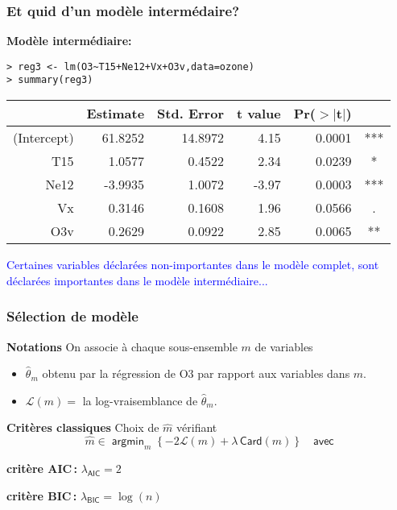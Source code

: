 \documentclass{beamer}
\newcommand{\ac}[1]{\left\{#1\right\}}
\begin{document}


\begin{frame}[fragile]
\frametitle{\bf  Et quid d'un mod\`ele interm\'edaire?}
{\bf Mod\`ele interm\'ediaire:}
\begin{small}
\begin{verbatim}
> reg3 <- lm(O3~T15+Ne12+Vx+O3v,data=ozone)
> summary(reg3)
\end{verbatim}
\begin{tabular}{r|rrrrc}
 & Estimate & Std. Error & t value & Pr($>$$|$t$|$)& \\ 
  \hline
(Intercept) & 61.8252 & 14.8972 & 4.15 & 0.0001& ***\\ 
  T15 & 1.0577 & 0.4522 & 2.34 & 0.0239& *\\ 
  Ne12 & -3.9935 & 1.0072 & -3.97 & 0.0003& ***\\ 
  Vx & 0.3146 & 0.1608 & 1.96 & 0.0566& .\\ 
  O3v & 0.2629 & 0.0922 & 2.85 & 0.0065& **
\end{tabular}
\end{small}
\vfill

\textcolor{blue}{Certaines variables d\'eclar\'ees non-importantes dans le mod\`ele complet, sont d\'eclar\'ees importantes dans le mod\`ele interm\'ediaire...}
\vfill

\centerline{} 
\end{frame}

\begin{frame}
\frametitle{\bf S\'election de mod\`ele}
\begin{block}{\bf Notations}
On associe \`a chaque sous-ensemble $m$ de variables
\begin{itemize}
\item $\widehat \theta_{m}$ obtenu par la r\'egression de O3 par rapport aux variables dans $m$. 
\item $\mathcal{L}(m)=$ la log-vraisemblance de $\widehat \theta_{m}$.
\end{itemize}
\end{block}
\vfill

\begin{block}{\bf Crit\`eres classiques}
Choix de $\widehat m$ v\'erifiant
$$\widehat m \in\mathop{\textsf{argmin}}_{m} \ac{-2 \mathcal{L}(m)+\lambda\, \textsf{Card}(m)}\quad \textsf{avec}$$

{\bf crit\`ere AIC\,:} $\lambda_{\textsf{AIC}}=2$

{\bf crit\`ere BIC\,:}  $\lambda_{\textsf{BIC}}=\log(n)$
\end{block}
\end{frame}
\end{document}
